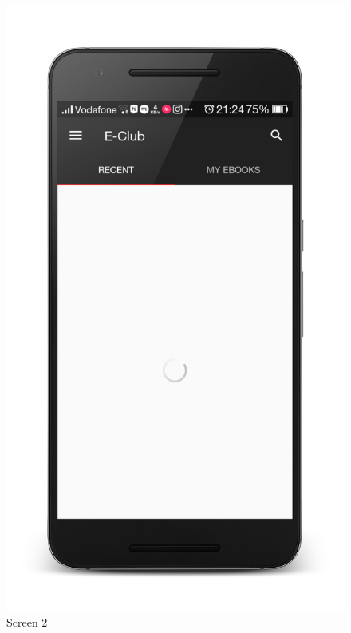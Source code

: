 \begin{figure}[ht]
\centering
\includegraphics[scale=0.13]{images/d15.png}
\caption{Screen 2}
\end{figure}

\newpage


